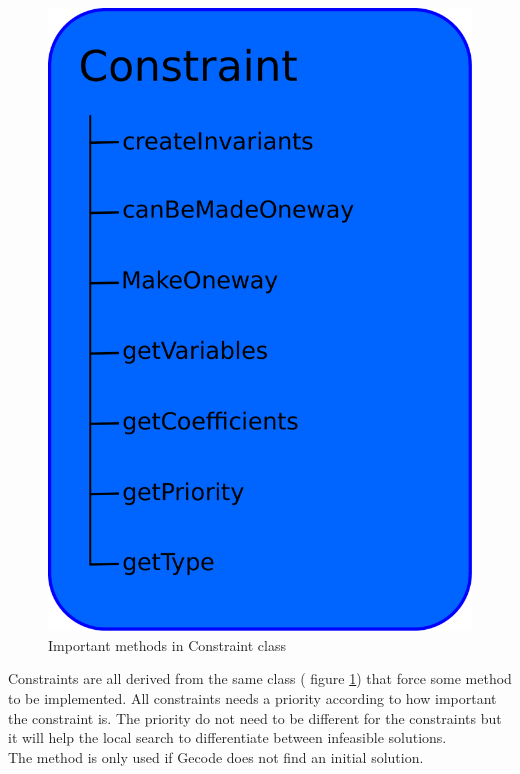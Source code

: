 \begin{figure}[!b]
\begin{center}
 \includegraphics[width=\linewidth/2]{constraint.pdf} \caption{Important methods in Constraint 
class}\label{fig_constraint}
\end{center} 
\end{figure}
Constraints are all derived from the same class ( figure \ref{fig_constraint}) that force some method 
to be implemented. All constraints needs a priority according to how important the constraint is. The priority do not 
need to be different for the constraints but it will help the local search to differentiate between infeasible  
solutions. \\ The method  is only used if Gecode does not find an initial solution.   \\ 
